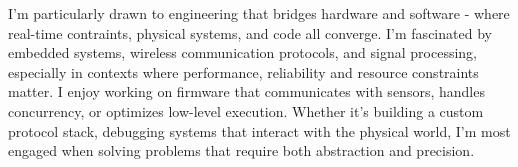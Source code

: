 
I'm particularly drawn to engineering that bridges hardware and software - where real-time contraints, physical systems, and code all converge.
I'm fascinated by embedded systems, wireless communication protocols, and signal processing, especially in contexts where performance, reliability and resource constraints matter.
I enjoy working on firmware that communicates with sensors, handles concurrency, or optimizes low-level execution.
Whether it's building a custom protocol stack, debugging systems that interact with the physical world, I'm most engaged when solving problems that require both abstraction and precision.
